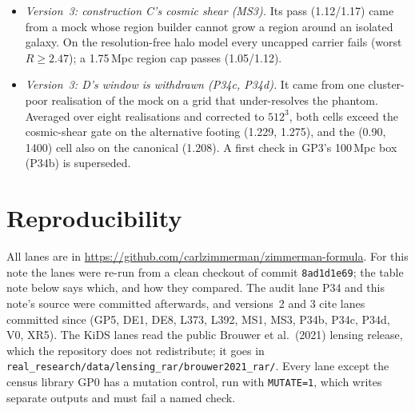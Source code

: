 \documentclass[10pt]{article}
\newcommand{\fpath}[1]{\nolinkurl{#1}}
\begin{document}
\begin{itemize}
\item \emph{Version~3: construction C's cosmic shear (MS3).} Its pass (1.12/1.17) came from a mock whose region builder cannot grow a region around an isolated galaxy. On the resolution-free halo model every uncapped carrier fails (worst $R\geq2.47$); a 1.75\,Mpc region cap passes (1.05/1.12).
\item \emph{Version~3: D's window is withdrawn (P34c, P34d).} It came from one cluster-poor realisation of the mock on a grid that under-resolves the phantom. Averaged over eight realisations and corrected to $512^3$, both cells exceed the cosmic-shear gate on the alternative footing (1.229, 1.275), and the (0.90, 1400) cell also on the canonical (1.208). A first check in GP3's 100\,Mpc box (P34b) is superseded.
\end{itemize}

\section{Reproducibility}\label{sec:repro}
All lanes are in \url{https://github.com/carlzimmerman/zimmerman-formula}. For this note the lanes were re-run from a clean checkout of commit \texttt{8ad1d1e69}; the table note below says which, and how they compared. The audit lane P34 and this note's source were committed afterwards, and versions~2 and 3 cite lanes committed since (GP5, DE1, DE8, L373, L392, MS1, MS3, P34b, P34c, P34d, V0, XR5). The KiDS lanes read the public Brouwer et al.\ (2021) lensing release, which the repository does not redistribute; it goes in \fpath{real_research/data/lensing_rar/brouwer2021_rar/}. Every lane except the census library GP0 has a mutation control, run with \texttt{MUTATE=1}, which writes separate outputs and must fail a named check.
\end{document}
